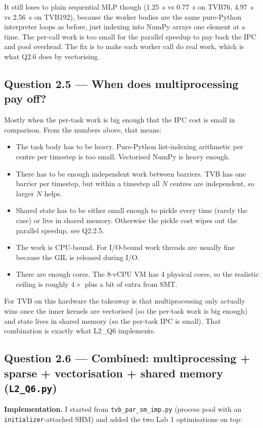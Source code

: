 \documentclass[11pt,a4paper]{article}
\newcommand{\Q}[1]{\subsection*{Question #1}}
\begin{document}
It still loses to plain sequential MLP though (1.25~s vs 0.77~s on
TVB76, 4.97~s vs 2.56~s on TVB192), because the worker bodies are
the same pure-Python interpreter loops as before, just indexing into
NumPy arrays one element at a time. The per-call work is too small
for the parallel speedup to pay back the IPC and pool overhead. The
fix is to make each worker call do real work, which is what Q2.6
does by vectorising.

\Q{2.5 — When does multiprocessing pay off?}

Mostly when the per-task work is big enough that the IPC cost is
small in comparison. From the numbers above, that means:

\begin{itemize}
    \item The task body has to be heavy. Pure-Python list-indexing
    arithmetic per centre per timestep is too small. Vectorised NumPy
    is heavy enough.
    \item There has to be enough independent work between barriers.
    TVB has one barrier per timestep, but within a timestep all $N$
    centres are independent, so larger $N$ helps.
    \item Shared state has to be either small enough to pickle every
    time (rarely the case) or live in shared memory. Otherwise the
    pickle cost wipes out the parallel speedup, see Q2.2.5.
    \item The work is CPU-bound. For I/O-bound work threads are
    usually fine because the GIL is released during I/O.
    \item There are enough cores. The 8-vCPU VM has 4 physical cores,
    so the realistic ceiling is roughly $4\times$ plus a bit of extra
    from SMT.
\end{itemize}

For TVB on this hardware the takeaway is that multiprocessing only
actually wins once the inner kernels are vectorised (so the per-task
work is big enough) and state lives in shared memory (so the
per-task IPC is small). That combination is exactly what L2\_Q6
implements.

\Q{2.6 — Combined: multiprocessing + sparse + vectorisation + shared memory (\texttt{L2\_Q6.py})}

\textbf{Implementation.} I started from \texttt{tvb\_par\_sm\_imp.py}
(process pool with an \texttt{initializer}-attached SHM) and added the
two Lab 1 optimisations on top:
\end{document}
